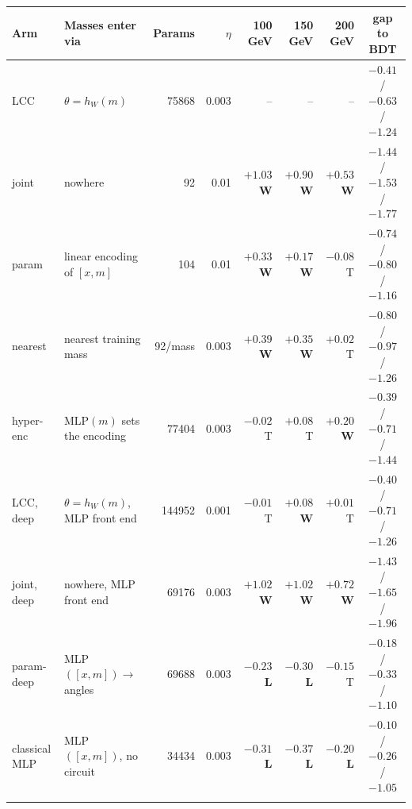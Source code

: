 \begin{tabular}{@{}llrrrrrc@{}}
\toprule
Arm & Masses enter via & Params & $\eta$ & 100 GeV & 150 GeV & 200 GeV & gap to BDT \\
\midrule
LCC & $\theta=h_W(m)$ & 75868 & 0.003 & -- & -- & -- & $-0.41$ / $-0.63$ / $-1.24$ \\
joint & nowhere & 92 & 0.01 & $+1.03$\,\textbf{W} & $+0.90$\,\textbf{W} & $+0.53$\,\textbf{W} & $-1.44$ / $-1.53$ / $-1.77$ \\
param & linear encoding of $[x,m]$ & 104 & 0.01 & $+0.33$\,\textbf{W} & $+0.17$\,\textbf{W} & $-0.08$\,T & $-0.74$ / $-0.80$ / $-1.16$ \\
nearest & nearest training mass & 92/mass & 0.003 & $+0.39$\,\textbf{W} & $+0.35$\,\textbf{W} & $+0.02$\,T & $-0.80$ / $-0.97$ / $-1.26$ \\
hyper-enc & MLP$(m)$ sets the encoding & 77404 & 0.003 & $-0.02$\,T & $+0.08$\,T & $+0.20$\,\textbf{W} & $-0.39$ / $-0.71$ / $-1.44$ \\
LCC, deep & $\theta=h_W(m)$, MLP front end & 144952 & 0.001 & $-0.01$\,T & $+0.08$\,\textbf{W} & $+0.01$\,T & $-0.40$ / $-0.71$ / $-1.26$ \\
joint, deep & nowhere, MLP front end & 69176 & 0.003 & $+1.02$\,\textbf{W} & $+1.02$\,\textbf{W} & $+0.72$\,\textbf{W} & $-1.43$ / $-1.65$ / $-1.96$ \\
param-deep & MLP$([x,m])\to$ angles & 69688 & 0.003 & $-0.23$\,\textbf{L} & $-0.30$\,\textbf{L} & $-0.15$\,T & $-0.18$ / $-0.33$ / $-1.10$ \\
classical MLP & MLP$([x,m])$, no circuit & 34434 & 0.003 & $-0.31$\,\textbf{L} & $-0.37$\,\textbf{L} & $-0.20$\,\textbf{L} & $-0.10$ / $-0.26$ / $-1.05$ \\
\botrule
\end{tabular}
